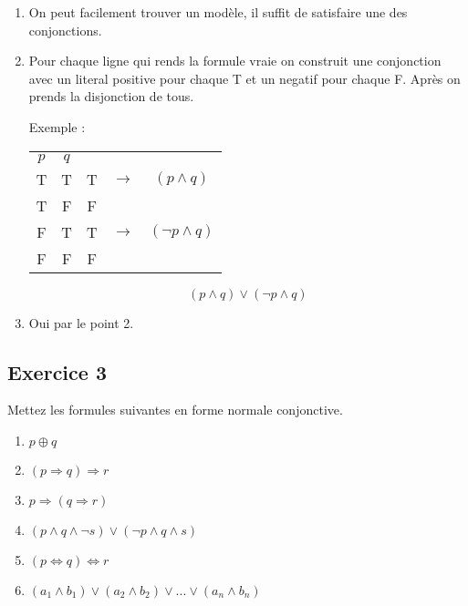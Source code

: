\begin{enumerate}
	\item On peut facilement trouver un modèle, il suffit de satisfaire une des conjonctions.
	\item Pour chaque ligne qui rends la formule vraie on construit une conjonction avec un literal positive pour chaque T et un negatif pour chaque F. Après on prends la disjonction de tous. 
	
	Exemple :
	

	\begin{tabular}{cc|ccc}
		$p$ & $q$ & &\\
		\cline{1-3}
		T&T&T&$\rightarrow$& $(p \land q)$\\
		T&F&F&&\\
		F&T&T&$\rightarrow$ & $(\neg p \land q)$\\
		F&F&F&&\\
	\end{tabular}
	 
	$$ (p \land q) \lor (\neg p \land q)$$
	\item Oui par le point 2.
\end{enumerate}

\subsection*{Exercice 3}
Mettez les formules suivantes en forme normale conjonctive.
\begin{enumerate}
	\item $ p \oplus q$
	\item $ (p \Rightarrow q) \Rightarrow r  $
	\item $ p \Rightarrow (q \Rightarrow r)  $
	\item $ (p \land q \land \neg s)\lor (\neg p \land q \land s) $
	\item $ (p\Leftrightarrow q) \Leftrightarrow r $ 
	\item $ (a_1 \land b_1 ) \lor (a_2 \land b_2 ) \lor ... \lor (a_n \land b_n )  $
	
\end{enumerate}

